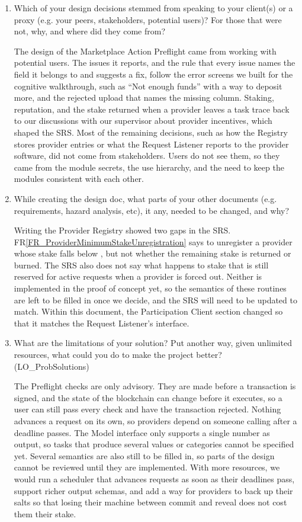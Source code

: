 \documentclass[12pt, titlepage]{article}
\newcommand{\rref}[1]{FR\ref{#1}}
\let\unbreakabletexttt\texttt
\renewcommand{\texttt}[1]{\unbreakabletexttt{\seqsplit{#1}}}
\begin{document}
\begin{enumerate}
  \item Which of your design decisions stemmed from speaking to your client(s)
  or a proxy (e.g. your peers, stakeholders, potential users)? For those that
  were not, why, and where did they come from?

  The design of the Marketplace Action Preflight came from working with
  potential users. The issues it reports, and the rule that every issue names
  the field it belongs to and suggests a fix, follow the error screens we built
  for the cognitive walkthrough, such as ``Not enough funds'' with a way to
  deposit more, and the rejected upload that names the missing column.
  Staking, reputation, and the stake returned when a provider leaves a task
  trace back to our discussions with our supervisor about provider incentives,
  which shaped the SRS. Most of the remaining decisions, such as how the
  Registry stores provider entries or what the Request Listener reports to the
  provider software, did not come from stakeholders. Users do not see them, so
  they came from the module secrets, the use hierarchy, and the need to keep
  the modules consistent with each other.

  \item While creating the design doc, what parts of your other documents (e.g.
  requirements, hazard analysis, etc), it any, needed to be changed, and why?

  Writing the Provider Registry showed two gaps in the SRS.
  \rref{FR_ProviderMinimumStakeUnregistration} says to unregister a provider
  whose stake falls below \texttt{MINIMUM\_PROVIDER\_STAKE}, but not whether
  the remaining stake is returned or burned. The SRS also does not say what
  happens to stake that is still reserved for active requests when a provider
  is forced out. Neither is implemented in the proof of concept yet, so the
  semantics of these routines are left to be filled in once we decide, and the
  SRS will need to be updated to match. Within this document, the
  Participation Client section changed so that it matches the Request
  Listener's interface.

  \item What are the limitations of your solution?  Put another way, given
  unlimited resources, what could you do to make the project better? (LO\_ProbSolutions)

  The Preflight checks are only advisory. They are made before a transaction
  is signed, and the state of the blockchain can change before it executes, so
  a user can still pass every check and have the transaction rejected. Nothing
  advances a request on its own, so providers depend on someone calling
  \texttt{advancePhase} after a deadline passes. The Model interface only
  supports a single number as output, so tasks that produce several values or
  categories cannot be specified yet. Several semantics are also still to be
  filled in, so parts of the design cannot be reviewed until they are
  implemented. With more resources, we would run a scheduler that advances
  requests as soon as their deadlines pass, support richer output schemas, and
  add a way for providers to back up their salts so that losing their machine
  between commit and reveal does not cost them their stake.


\end{enumerate}
\end{document}
